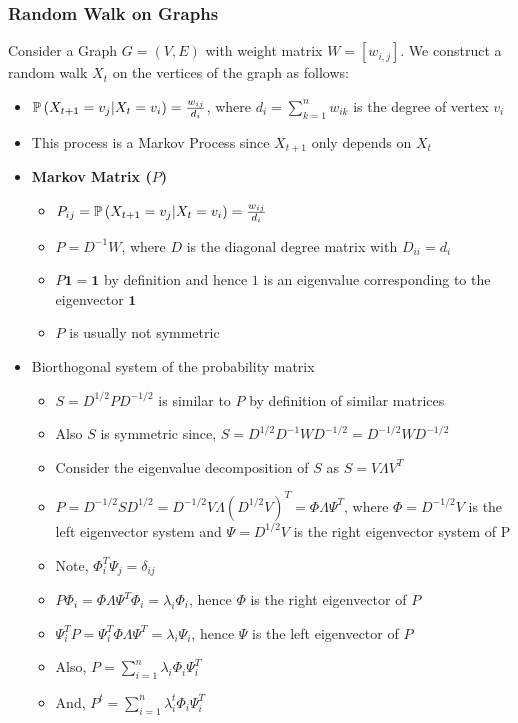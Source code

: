 \documentclass{article}
\begin{document}
\subsubsection{Random Walk on Graphs}
Consider a Graph $G=(V,E)$ with weight matrix $W=[w_{i,j}]$. We construct a random walk $X_t$ on the vertices of the graph as follows:
\begin{itemize}
    \item $\mathbb{P}\left( X_{t+1} = v_j | X_{t}=v_i \right) = \frac{w_{ij}}{d_i}$, where $d_i = \sum_{k=1}^n w_{ik}$ is the degree of vertex $v_i$
    \item This process is a Markov Process since $X_{t+1}$ only depends on $X_t$
    \item \textbf{Markov Matrix ($P$)}
    \begin{itemize}
        \item $P_{ij} = \mathbb{P}\left( X_{t+1} = v_j | X_{t}=v_i \right) = \frac{w_{ij}}{d_i}$
        \item $P = D^{-1}W$, where $D$ is the diagonal degree matrix with $D_{ii}=d_i$
        \item $P\mathbf{1} = \mathbf{1}$ by definition and hence $1$ is an eigenvalue corresponding to the eigenvector $\mathbf{1}$
        \item $P$ is usually not symmetric
    \end{itemize}
    \item Biorthogonal system of the probability matrix
    \begin{itemize}
        \item $S = D^{1/2}PD^{-1/2}$ is similar to $P$ by definition of similar matrices
        \item Also $S$ is symmetric since, $S=  D^{1/2}D^{-1}WD^{-1/2} = D^{-1/2}WD^{-1/2}$
        \item Consider the eigenvalue decomposition of $S$ as $S = V\Lambda V^T$
        \item $P = D^{-1/2}SD^{1/2} = D^{-1/2}V\Lambda (D^{1/2}V)^T = \Phi \Lambda \Psi^T$, where $\Phi = D^{-1/2}V$ is the left eigenvector system and $\Psi = D^{1/2}V$ is the right eigenvector system of P
        \item Note, $\Phi_i^T \Psi_j = \delta_{ij}$
        \item $P\Phi_i = \Phi \Lambda \Psi^T \Phi_i = \lambda_{i} \Phi_i$, hence $\Phi$ is the right eigenvector of $P$
        \item $\Psi_i^TP = \Psi_i^T\Phi \Lambda \Psi^T = \lambda_{i} \Psi_i$, hence $\Psi$ is the left eigenvector of $P$
        \item Also, $P = \sum_{i=1}^n \lambda_i \Phi_i\Psi_i^T$
        \item And, $P^t = \sum_{i=1}^n \lambda_i^t \Phi_i\Psi_i^T$
    \end{itemize}
\end{itemize}
\end{document}
